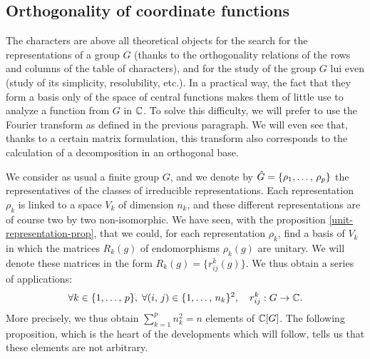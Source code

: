 \subsection{Orthogonality of coordinate functions}
 
 
The characters are above all theoretical objects for the search for the representations of a group $ G $ (thanks to the orthogonality relations of the rows and columns of the table of characters), and for the study of the group $ G $ lui even (study of its simplicity, resolubility, etc.). In a practical way, the fact that they form a basis only of the space of central functions makes them of little use to analyze a function from $ G $ in $ \mathbb{C} $. To solve this difficulty, we will prefer to use the Fourier transform as defined in the previous paragraph. We will even see that, thanks to a certain matrix formulation, this transform also corresponds to the calculation of a decomposition in an orthogonal base.
 
 
 We consider as usual a finite group $ G $, and we denote by $ \hat{G} = \{\rho_1, \ldots, \, \rho_p\} $ the representatives of the classes of irreducible representations. Each representation $ \rho_k $ is linked to a space $ V_k $ of dimension $ n_k $, and these different representations are of course two by two non-isomorphic. We have seen, with the proposition \ref{unit-representation-prop}, that we could, for each representation $ \rho_k $, find a basis of $ V_k $ in which the matrices $ R_k (g) $ of endomorphisms $ \rho_k (g) $ are unitary. We will denote these matrices in the form $ R_k (g) = \{r_{ij}^k (g)\} $. We thus obtain a series of applications:
\begin{equation*}
\forall k \in \{1, \ldots, \, p\}, \; \forall (i, \, j) \in \{1, \ldots, \, n_k\}^2, \quad r_{ij}^k: G \rightarrow \mathbb{C}.
\end{equation*}
More precisely, we thus obtain $ \sum_{k = 1}^{p}{n_k^2} = n $ elements of $ \mathbb{C} [G] $. The following proposition, which is the heart of the developments which will follow, tells us that these elements are not arbitrary.
 
